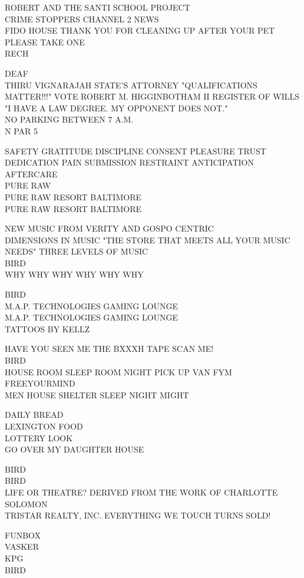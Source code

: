 \documentclass[10pt,letterpaper]{article}
\begin{document}
ROBERT AND THE SANTI SCHOOL PROJECT\\
CRIME STOPPERS CHANNEL 2 NEWS\\
FIDO HOUSE THANK YOU FOR CLEANING UP AFTER YOUR PET PLEASE TAKE ONE\\
RECH

DEAF\\
THIRU VIGNARAJAH STATE'S ATTORNEY "QUALIFICATIONS MATTER!!!" VOTE ROBERT M. HIGGINBOTHAM II REGISTER OF WILLS "I HAVE A LAW DEGREE.  MY OPPONENT DOES NOT."\\
NO PARKING BETWEEN 7 A.M.\\
N PAR 5

SAFETY GRATITUDE DISCIPLINE CONSENT PLEASURE TRUST DEDICATION PAIN SUBMISSION RESTRAINT ANTICIPATION AFTERCARE\\
PURE RAW\\
PURE RAW RESORT BALTIMORE\\
PURE RAW RESORT BALTIMORE

NEW MUSIC FROM VERITY AND GOSPO CENTRIC\\
DIMENSIONS IN MUSIC "THE STORE THAT MEETS ALL YOUR MUSIC NEEDS" THREE LEVELS OF MUSIC\\
BIRD\\
WHY WHY WHY WHY WHY WHY

BIRD\\
M.A.P. TECHNOLOGIES GAMING LOUNGE\\
M.A.P. TECHNOLOGIES GAMING LOUNGE\\
TATTOOS BY KELLZ

HAVE YOU SEEN ME THE BXXXH TAPE SCAN ME!\\
BIRD\\
HOUSE ROOM SLEEP ROOM NIGHT PICK UP VAN FYM FREEYOURMIND\\
MEN HOUSE SHELTER SLEEP NIGHT MIGHT

DAILY BREAD\\
LEXINGTON FOOD\\
LOTTERY LOOK\\
GO OVER MY DAUGHTER HOUSE

BIRD\\
BIRD\\
LIFE OR THEATRE? DERIVED FROM THE WORK OF CHARLOTTE SOLOMON\\
TRISTAR REALTY, INC. EVERYTHING WE TOUCH TURNS SOLD!

FUNBOX\\
VASKER\\
KPG\\
BIRD
\end{document}
